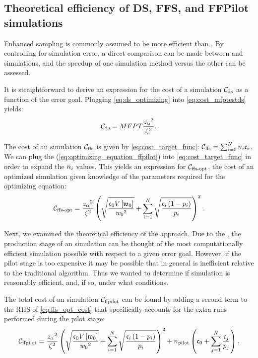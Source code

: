 \subsection{Theoretical efficiency of DS, FFS, and FFPilot simulations}
\label{sec:efficiency}

Enhanced sampling is commonly assumed to be more efficient than . By controlling for simulation error, a direct comparison can be made between  and  simulations, and the speedup of one simulation method versus the other can be assessed.

It is straightforward to derive an expression for the cost of a  simulation ${\mathcal{C}}_{\textrm{ds}}$ as a function of the error goal. Plugging \eqref{eq:ds_optimizing} into \eqref{eq:cost_mfptestds} yields:
    \begin{equation}
       \label{eq:ds_cost}
        {\mathcal{C}}_{\textrm{ds}} = MFPT \frac{z_{\alpha} {}^2}{\zeta {}^2}.
    \end{equation}

The cost of an  simulation ${\mathcal{C}}_{\textrm{ffs}}$ is given by \eqref{eq:cost_target_func}: ${\mathcal{C}}_{\textrm{ffs}} = \sum_{i=0}^{N} n_{i} \mathfrak{c}_{i}$. We can plug the \opteq{} (\eqref{eq:optimizing_equation_ffpilot}) into \eqref{eq:cost_target_func} in order to expand the $n_{i}$ values. This yields an expression for ${\mathcal{C}}_{\textrm{ffs-opt}}$, the cost of an optimized  simulation given \apriori knowledge of the parameters required for the optimizing equation:
    \begin{equation}
        \label{eq:ffs_opt_cost}
        {\mathcal{C}}_{\textrm{ffs-opt}} = \frac{z_{\alpha} {}^2}{\zeta {}^2} \left(\sqrt{\frac{\mathfrak{c}_{0} V \left[ \mathfrak{w}_{0} \right]}{w_{0} {}^2}} + \sum_{i=1}^N \sqrt{\frac{\mathfrak{c}_{i} \left( 1-p_{i} \right)}{p_{i}}} \right)^2.
    \end{equation}

Next, we examined the theoretical efficiency of the  approach. Due to the \opteq{}, the production stage of an  simulation can be thought of the most computationally efficient  simulation possible with respect to a given error goal. However, if the pilot stage is too expensive it may be possible that in general  is inefficient relative to the traditional  algorithm. Thus we wanted to determine if  simulation is reasonably efficient, and, if so, under what conditions.

The total cost of an  simulation ${\mathcal{C}}_{\textrm{ffpilot}}$ can be found by adding a second term to the RHS of \eqref{eq:ffs_opt_cost} that specifically accounts for the extra runs performed during the pilot stage:
    \begin{equation}
    \label{eq:ffpilot_cost}
        {\mathcal{C}}_{\textrm{ffpilot}} = \frac{z_{\alpha} {}^2}{\zeta {}^2}\left(\sqrt{\frac{\mathfrak{c}_{0} V \left[ \mathfrak{w}_{0} \right]}{w_{0} {}^2}} + \sum_{i=1}^N \sqrt{\frac{\mathfrak{c}_{i} \left( 1-p_{i} \right)}{p_{i}}} \right)^2 + n_{\textrm{pilot}} \left( \mathfrak{c}_{0} + \sum _{j=1}^N \frac{\mathfrak{c}_{j}}{p_{j}} \right).
    \end{equation}


